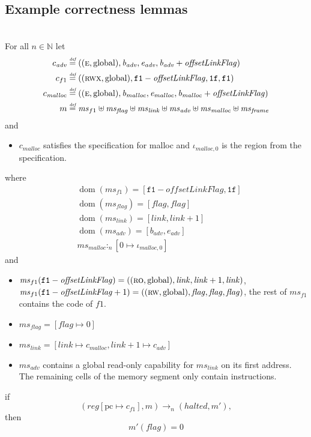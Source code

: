 \documentclass[format=acmsmall, review=true, screen=true]{acmart}
\newcommand{\forcenewline}{$\phantom{v}$\\}
\newcommand{\update}[2]{[#1 \mapsto #2]}
\newcommand{\defeq}{\stackrel{\textit{\tiny{def}}}{=}}
\DeclareMathOperator{\dom}{dom}
\newcommand{\var}[1]{\mathit{#1}}
\newcommand{\hs}{\var{ms}}
\newcommand{\ms}{\hs}
\newcommand{\pcreg}{\mathrm{pc}}
\newcommand{\start}{\var{b}}
\newcommand{\addrend}{\var{e}}
\newcommand{\reg}{\var{reg}}
\newcommand{\heap}{\var{mem}}
\newcommand{\adv}{\var{adv}}
\newcommand{\link}{\var{link}}
\newcommand{\flag}{\var{flag}}
\newcommand{\olf}{\var{offsetLinkFlag}}
\newcommand{\halted}{\mathit{halted}}
\newcommand{\heapSat}[3][\heap]{#1 :_{#2} #3}
\newcommand{\codelabel}[1]{\mathit{#1}}
\newcommand{\malloc}{\codelabel{malloc}}
\newcommand{\nats}{\mathbb{N}}
\newcommand{\plainperm}[1]{\textsc{#1}}
\newcommand{\readonly}{\plainperm{ro}}
\newcommand{\readwrite}{\plainperm{rw}}
\newcommand{\entry}{\plainperm{e}}
\newcommand{\rwx}{\plainperm{rwx}}
\newcommand{\plainlocality}[1]{\mathrm{#1}}
\newcommand{\glob}{\plainlocality{global}}
\newcommand{\step}[1][]{\rightarrow_{#1}}
\begin{document}
 \subsection{Example correctness lemmas}
\begin{lemma} \forcenewline
  \label{lem:correctness-f1-app}
  For all $n \in \nats$
  let
  \begin{align*}
    c_{\var{adv}} & \defeq ((\entry,\glob),\start_{\adv},\addrend_{\adv},\start_{\adv}+\olf) \\
    c_{f1} & \defeq ((\rwx,\glob),\mathtt{f1}-\olf,\mathtt{1f},\mathtt{f1}) \\
    c_\malloc & \defeq ((\entry,\glob),\start_\malloc,\addrend_\malloc,\start_\malloc+\olf) \\
    m & \defeq \hs_{f1} \uplus 
        \hs_\flag \uplus                
        \ms_{\var{link}} \uplus 
        \hs_\adv \uplus 
        \ms_{\malloc} \uplus 
        \hs_{\var{frame}} 
  \end{align*}
  and
  \begin{itemize}
  \item $c_\malloc$ satisfies the specification for malloc and $\iota_{\malloc,0}$ is the region from the specification.
  \end{itemize}
  where 
  \begin{align*}
    &\dom(\hs_{f1}) = [\mathtt{f1}-\olf,\mathtt{1f}] \\
    &\dom(\hs_\flag) = [\flag,\flag] \\
    &\dom(\ms_\link) = [\link,\link+1]\\
    &\dom(\hs_{\adv}) = [\start_\adv,\addrend_\adv] \\
    &\heapSat[\hs_{\malloc}]{n}{[0 \mapsto \iota_{\malloc,0}]}
  \end{align*}
  and
  \begin{itemize}
  \item $\ms_{f1}(\mathtt{f1}-\olf) = ((\readonly,\glob),\link,\link+1,\link)$, $\ms_{f1}(\mathtt{f1}-\olf+1) = ((\readwrite,\glob),\flag,\flag,\flag)$, the rest of $\hs_{f1}$ contains the code of $f1$.
  \item $\ms_\flag = [\flag \mapsto 0]$
  \item $\ms_{\var{link}} = [\var{link} \mapsto c_\malloc, \var{link} + 1 \mapsto c_\adv]$
  \item $\hs_\adv$ contains a global read-only capability for $\hs_\link$ on its first address. The remaining cells of the memory segment only contain instructions.
  \end{itemize}
  if 
  \[
    (\reg\update{\pcreg}{c_{f1}},m) \step[n] (\halted,m'),
  \]
  then
  \[
    m'(\flag) = 0
  \]  
\end{lemma}
\end{document}
